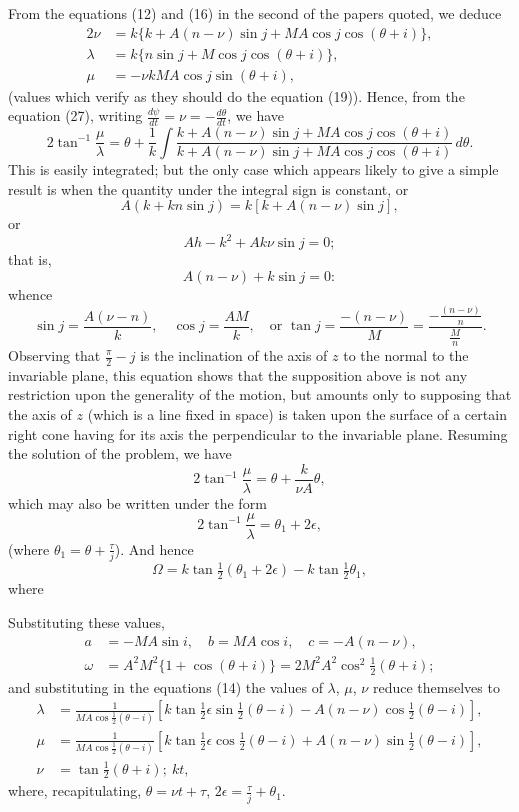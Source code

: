 \documentclass[11pt,a4paper]{book}
\begin{document}
From the equations (12) and (16) in the second of the papers quoted, we deduce
\begin{align*}
2\nu &= k\{k + A(n - \nu)\sin j + MA\cos j\cos(\theta + i)\}, \\
\lambda &= k\{n\sin j + M\cos j\cos(\theta + i)\}, \\
\mu &= -\nu kMA\cos j\sin(\theta + i),
\end{align*}
(values which verify as they should do the equation (19)). Hence, from the equation (27), writing $\frac{d\psi}{dt} = \nu = -\frac{d\theta}{dt}$, we have
\[
2\tan^{-1}\frac{\mu}{\lambda} = \theta + \frac{1}{k}\int \frac{k + A(n - \nu)\sin j + MA\cos j\cos(\theta + i)}{k + A(n - \nu)\sin j + MA\cos j\cos(\theta + i)}\, d\theta.
\]
This is easily integrated; but the only case which appears likely to give a simple result is when the quantity under the integral sign is constant, or
\[
A(k + kn\sin j) = k[k + A(n - \nu)\sin j],
\]
or
\[
Ah - k^{2} + Ak\nu\sin j = 0;
\]
that is,
\[
A(n - \nu) + k\sin j = 0:
\]
whence
\[
\sin j = \frac{A(\nu - n)}{k}, \quad \cos j = \frac{AM}{k}, \quad \text{or } \tan j = \frac{-(n - \nu)}{M} = \frac{-\frac{(n - \nu)}{n}}{\frac{M}{n}}.
\]
Observing that $\frac{\pi}{2} - j$ is the inclination of the axis of $z$ to the normal to the invariable plane, this equation shows that the supposition above is not any restriction upon the generality of the motion, but amounts only to supposing that the axis of $z$ (which is a line fixed in space) is taken upon the surface of a certain right cone having for its axis the perpendicular to the invariable plane. Resuming the solution of the problem, we have
\[
2\tan^{-1}\frac{\mu}{\lambda} = \theta + \frac{k}{\nu A}\theta,
\]
which may also be written under the form
\[
2\tan^{-1}\frac{\mu}{\lambda} = \theta_{1} + 2\epsilon,
\]
(where $\theta_{1} = \theta + \frac{\tau}{j}$). And hence
\[
\Omega = k\tan\tfrac{1}{2}(\theta_{1} + 2\epsilon) - k\tan\tfrac{1}{2}\theta_{1},
\]
where

\newpage

\setcounter{page}{464}

Substituting these values,
\begin{align*}
a &= -MA\sin i, \quad b = MA\cos i, \quad c = -A(n - \nu), \\
\omega &= A^{2}M^{2}\{1 + \cos(\theta + i)\} = 2M^{2}A^{2}\cos^{2}\tfrac{1}{2}(\theta + i);
\end{align*}
and substituting in the equations (14) the values of $\lambda$, $\mu$, $\nu$ reduce themselves to
\begin{align*}
\lambda &= \frac{1}{MA\cos\tfrac{1}{2}(\theta - i)}[k\tan\tfrac{1}{2}\epsilon\sin\tfrac{1}{2}(\theta - i) - A(n - \nu)\cos\tfrac{1}{2}(\theta - i)], \\
\mu &= \frac{1}{MA\cos\tfrac{1}{2}(\theta - i)}[k\tan\tfrac{1}{2}\epsilon\cos\tfrac{1}{2}(\theta - i) + A(n - \nu)\sin\tfrac{1}{2}(\theta - i)], \\
\nu &= \tan\tfrac{1}{2}(\theta + i);\ kt,
\end{align*}
where, recapitulating, $\theta = \nu t + \tau$, $2\epsilon = \frac{\tau}{j} + \theta_{1}$.
\end{document}
